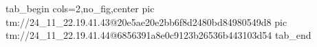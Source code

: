  
 
 
 
 

\qqSecOrig


\ifcmt
  tab_begin cols=2,no_fig,center
    pic tm://24_11_22.19.41.43@20e5ae20e2bb6f8d2480bd84980549d8
    pic tm://24_11_22.19.41.44@6856391a8e0c9123b26536b443103d54
  tab_end
\fi

